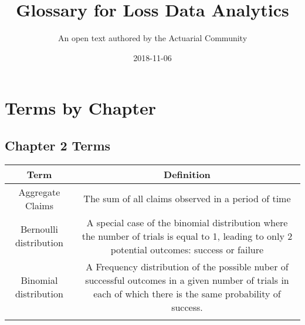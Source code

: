 \documentclass[]{book}
\title{Glossary for Loss Data Analytics}
\author{An open text authored by the Actuarial Community}
\date{2018-11-06}
\theoremstyle{definition}
\theoremstyle{definition}
\theoremstyle{definition}
\theoremstyle{remark}
\begin{document}
\maketitle

{
\setcounter{tocdepth}{1}
\tableofcontents
}
\chapter{Terms by Chapter}\label{terms-by-chapter}

\section{Chapter 2 Terms}\label{chapter-2-terms}

\begin{longtable}[]{@{}cc@{}}
\toprule
\begin{minipage}[b]{0.43\columnwidth}\centering\strut
Term\strut
\end{minipage} & \begin{minipage}[b]{0.43\columnwidth}\centering\strut
Definition\strut
\end{minipage}\tabularnewline
\midrule
\endhead
\begin{minipage}[t]{0.43\columnwidth}\centering\strut
Aggregate Claims\strut
\end{minipage} & \begin{minipage}[t]{0.43\columnwidth}\centering\strut
The sum of all claims observed in a period of time\strut
\end{minipage}\tabularnewline
\begin{minipage}[t]{0.43\columnwidth}\centering\strut
Bernoulli distribution\strut
\end{minipage} & \begin{minipage}[t]{0.43\columnwidth}\centering\strut
A special case of the binomial distribution where the number of trials
is equal to 1, leading to only 2 potential outcomes: success or
failure\strut
\end{minipage}\tabularnewline
\begin{minipage}[t]{0.43\columnwidth}\centering\strut
Binomial distribution\strut
\end{minipage} & \begin{minipage}[t]{0.43\columnwidth}\centering\strut
A Frequency distribution of the possible nuber of successful outcomes in
a given number of trials in each of which there is the same probability
of success.\strut
\end{minipage}\tabularnewline
\begin{minipage}[t]{0.43\columnwidth}\centering\strut

\end{minipage}
\end{longtable}
\end{document}

